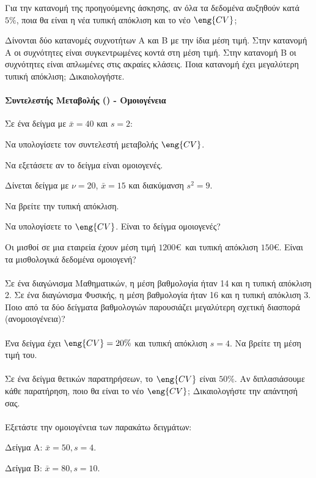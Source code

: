 \documentclass[11pt,a4paper,modern]{FFExercises}
\begin{document}
\askhsh
Για την κατανομή της προηγούμενης άσκησης, αν όλα τα δεδομένα αυξηθούν κατά $5\%$, ποια θα είναι η νέα τυπική απόκλιση και το νέο $\eng{CV}$;

\askhsh
Δίνονται δύο κατανομές συχνοτήτων Α και Β με την ίδια μέση τιμή.
Στην κατανομή Α οι συχνότητες είναι συγκεντρωμένες κοντά στη μέση τιμή.
Στην κατανομή Β οι συχνότητες είναι απλωμένες στις ακραίες κλάσεις.
Ποια κατανομή έχει μεγαλύτερη τυπική απόκλιση; Δικαιολογήστε.

\paragraph{Συντελεστής Μεταβολής () - Ομοιογένεια}

\askhsh
Σε ένα δείγμα με $\bar{x}=40$ και $s=2$:
\begin{alist}
    \item Να υπολογίσετε τον συντελεστή μεταβολής $\eng{CV}$.
    \item Να εξετάσετε αν το δείγμα είναι ομοιογενές.
\end{alist}

\askhsh
Δίνεται δείγμα με $\nu=20$, $\bar{x}=15$ και διακύμανση $s^2=9$.
\begin{alist}
    \item Να βρείτε την τυπική απόκλιση.
    \item Να υπολογίσετε το $\eng{CV}$. Είναι το δείγμα ομοιογενές?
\end{alist}
\askhsh
Οι μισθοί σε μια εταιρεία έχουν μέση τιμή $1200$\euro\ και τυπική απόκλιση $150$\euro. Είναι τα μισθολογικά δεδομένα ομοιογενή?\\\\
\askhsh
Σε ένα διαγώνισμα Μαθηματικών, η μέση βαθμολογία ήταν 14 και η τυπική απόκλιση 2.
Σε ένα διαγώνισμα Φυσικής, η μέση βαθμολογία ήταν 16 και η τυπική απόκλιση 3.
Ποιο από τα δύο δείγματα βαθμολογιών παρουσιάζει μεγαλύτερη σχετική διασπορά (ανομοιογένεια)?\\\\
\askhsh
Ένα δείγμα έχει $\eng{CV}=20\%$ και τυπική απόκλιση $s=4$. Να βρείτε τη μέση τιμή του.\\\\
\askhsh
Σε ένα δείγμα θετικών παρατηρήσεων, το $\eng{CV}$ είναι $50\%$. Αν διπλασιάσουμε κάθε παρατήρηση, ποιο θα είναι το νέο $\eng{CV}$; Δικαιολογήστε την απάντησή σας.\\\\
\askhsh
Εξετάστε την ομοιογένεια των παρακάτω δειγμάτων:
\begin{alist}
    \item Δείγμα Α: $\bar{x}=50, s=4$.
    \item Δείγμα Β: $\bar{x}=80, s=10$.
\end{alist}
\end{document}
